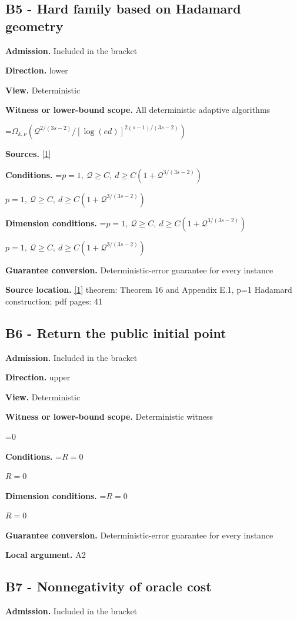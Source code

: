 \documentclass[10pt,a4paper]{article}
\newcommand{\AtlasMath}[1]{\par\begingroup\centering\setbox0=\hbox{$\displaystyle #1$}\ifdim\wd0>1.4\linewidth\typeout{ATLAS WIDE FORMULA: \the\wd0}\fi\ifdim\wd0>\linewidth\resizebox{\linewidth}{!}{\box0}\else\box0\fi\par\endgroup}
\newcommand{\AtlasInlineMath}[1]{\begingroup\setbox0=\hbox{$#1$}\ifdim\wd0>.4\linewidth\endgroup\AtlasMath{#1}\else\endgroup$#1$\fi}
\begin{document}
\subsection{B5 - Hard family based on Hadamard geometry}
\textbf{Admission.} Included in the bracket

\textbf{Direction.} lower

\textbf{View.} Deterministic

\textbf{Witness or lower-bound scope.} All deterministic adaptive algorithms

\AtlasMath{\Omega_{k,\nu}(\mathcal{Q}^{2/(3s-2)}/[\log(ed)]^{2(s-1)/(3s-2)})}
\textbf{Sources.} \href{https://arxiv.org/pdf/2411.08987v2}{[1]}

\textbf{Conditions.} \AtlasInlineMath{p=1,\ \mathcal{Q}\ge C,\ d\ge C(1+\mathcal{Q}^{3/(3s-2)})}

\textbf{Dimension conditions.} \AtlasInlineMath{p=1,\ \mathcal{Q}\ge C,\ d\ge C(1+\mathcal{Q}^{3/(3s-2)})}

\textbf{Guarantee conversion.} Deterministic-error guarantee for every instance

\textbf{Source location.} \href{https://arxiv.org/pdf/2411.08987v2}{[1]} theorem: Theorem 16 and Appendix E.1, p=1 Hadamard construction; pdf pages: 41

\subsection{B6 - Return the public initial point}
\textbf{Admission.} Included in the bracket

\textbf{Direction.} upper

\textbf{View.} Deterministic

\textbf{Witness or lower-bound scope.} Deterministic witness

\AtlasMath{0}
\textbf{Conditions.} \AtlasInlineMath{R=0}

\textbf{Dimension conditions.} \AtlasInlineMath{R=0}

\textbf{Guarantee conversion.} Deterministic-error guarantee for every instance

\textbf{Local argument.} A2

\subsection{B7 - Nonnegativity of oracle cost}
\textbf{Admission.} Included in the bracket
\end{document}
